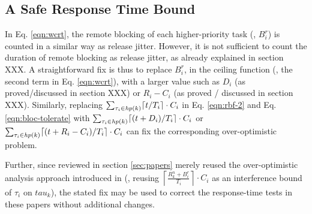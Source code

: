 \subsection{A Safe Response Time Bound}
\label{sec:safe_bound}

In Eq. \ref{eqn:wcrt}, the remote blocking of each higher-priority task (\ie, $B_i^r$) is counted in a similar way as release jitter. However, it is not sufficient to count the duration of remote blocking as release jitter, as already explained in section XXX. A straightforward fix is thus to replace $B_i^r$, in the ceiling function (\ie, the second term in Eq. \ref{eqn:wcrt}), with a larger value such as $D_i$ (as proved/discussed in section XXX) or $R_i - C_i$ (as proved / discussed in section XXX). Similarly, replacing $\sum_{\tau_i \in \mathit{hp}(k)} \lceil t / T_i \rceil \cdot C_i$ in Eq. \ref{eqn:rbf-2} and Eq. \ref{eqn:bloc-tolerate} with $\sum_{\tau_i \in \mathit{hp}(k)} \lceil (t+D_i) / T_i \rceil \cdot C_i$ or $\sum_{\tau_i \in \mathit{hp}(k)} \lceil (t+R_i-C_i) / T_i \rceil \cdot C_i$ can fix the corresponding over-optimistic problem.

Further, since \cite{zeng-2011,bbb-2013,yang-2013,kim-2014,han-2014,carminati-2014,yang-2014} reviewed in section \ref{sec:papers} merely reused the over-optimistic analysis approach introduced in \cite{lakshmanan-2009} (\ie, reusing $\left \lceil \frac{R_k^n + B_i^r}{T_i} \right \rceil \cdot C_i$ as an interference bound of $\tau_i$ on $tau_k$), the stated fix may be used to correct the response-time tests in these papers without additional changes.